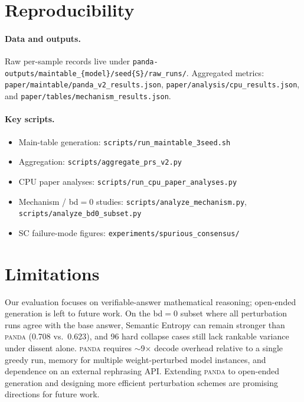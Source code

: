 \documentclass{article} %
\DeclareRobustCommand{\method}{%
  \texorpdfstring{%
    \ifmmode\text{\normalfont\textsc{panda}}\else\textsc{panda}\xspace\fi
  }{PANDA}%
}
\begin{document}
\section{Reproducibility}
\label{app:repro}

\paragraph{Data and outputs.}
Raw per-sample records live under \texttt{panda-outputs/maintable\_\{model\}/seed\{S\}/raw\_runs/}.
Aggregated metrics: \texttt{paper/maintable/panda\_v2\_results.json}, \texttt{paper/analysis/cpu\_results.json}, and \texttt{paper/tables/mechanism\_results.json}.

\paragraph{Key scripts.}
\begin{itemize}[leftmargin=*, itemsep=2pt]
  \item Main-table generation: \texttt{scripts/run\_maintable\_3seed.sh}
  \item Aggregation: \texttt{scripts/aggregate\_prs\_v2.py}
  \item CPU paper analyses: \texttt{scripts/run\_cpu\_paper\_analyses.py}
  \item Mechanism / bd$=0$ studies: \texttt{scripts/analyze\_mechanism.py}, \texttt{scripts/analyze\_bd0\_subset.py}
  \item SC failure-mode figures: \texttt{experiments/spurious\_consensus/}
\end{itemize}


\section{Limitations}
\label{app:limitations}

Our evaluation focuses on verifiable-answer mathematical reasoning; open-ended generation is left to future work.
On the bd$=0$ subset where all perturbation runs agree with the base answer, Semantic Entropy can remain stronger than \method{} (0.708 vs.\ 0.623), and 96 hard collapse cases still lack rankable variance under dissent alone.
\method{} requires $\sim$9$\times$ decode overhead relative to a single greedy run, memory for multiple weight-perturbed model instances, and dependence on an external rephrasing API.
Extending \method{} to open-ended generation and designing more efficient perturbation schemes are promising directions for future work.
\end{document}
